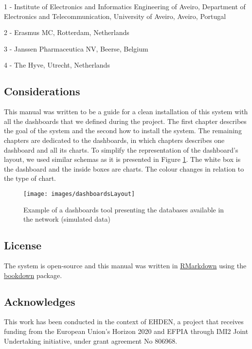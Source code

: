 \documentclass[
]{book}
\begin{document}
1 - Institute of Electronics and Informatics Engineering of Aveiro, Department of Electronics and Telecommunication, University of Aveiro, Aveiro, Portugal

2 - Erasmus MC, Rotterdam, Netherlands

3 - Janssen Pharmaceutica NV, Beerse, Belgium

4 - The Hyve, Utrecht, Netherlands

\hypertarget{considerations}{%
\subsection*{Considerations}\label{considerations}}

This manual was written to be a guide for a clean installation of this system with all the dashboards that we defined during the project. The first chapter describes the goal of the system and the second how to install the system. The remaining chapters are dedicated to the dashboards, in which chapters describes one dashboard and all its charts. To simplify the representation of the dashboard's layout, we used similar schemas as it is presented in Figure \ref{fig:dashboardsLayout}. The white box is the dashboard and the inside boxes are charts. The colour changes in relation to the type of chart.

\begin{figure}
\texttt{[image: images/dashboardsLayout]} \caption{Example of a dashboards tool presenting the databases available in the network (simulated data)}\label{fig:dashboardsLayout}
\end{figure}

\hypertarget{license}{%
\subsection*{License}\label{license}}

The system is open-source
and this manual was written in \href{https://rmarkdown.rstudio.com}{RMarkdown} using the \href{https://bookdown.org}{bookdown} package.

\hypertarget{acknowledges}{%
\subsection*{Acknowledges}\label{acknowledges}}

This work has been conducted in the context of EHDEN, a project that receives funding from the European Union's Horizon 2020 and EFPIA through IMI2 Joint Undertaking initiative, under grant agreement No 806968.
\end{document}
